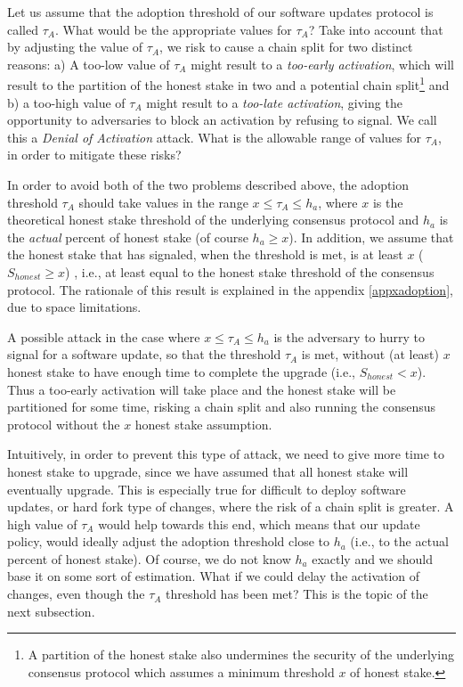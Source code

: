 Let us assume that the adoption threshold of our software updates protocol is called $\tau_A$. %
What would be the appropriate values for $\tau_A$? Take into account that by adjusting the value of $\tau_A$, we risk to cause a chain split for two distinct reasons: a) A too-low value of $\tau_A$ might result to a \emph{too-early activation}, which will result to the partition of the honest stake in two and a potential chain split\footnote{A partition of the honest stake also undermines the security of the underlying consensus protocol which assumes a minimum threshold $x$ of honest stake.}  and b) a too-high value of $\tau_A$ might result to a \emph{too-late activation}, giving the opportunity to adversaries to block an activation by refusing to signal. We call this a \emph{Denial of Activation} attack. %
What is the allowable range of values for $\tau_A$, in order to mitigate these risks?

In order to avoid both of the two problems described above, the adoption threshold $\tau_A$ should take values in the range $x \leq \tau_A \leq h_a$, where $x$ is the theoretical honest stake threshold of the underlying consensus protocol and $h_a$ is the \emph{actual} percent of honest stake (of course $h_a \geq x$). In addition, we assume that the honest stake that has signaled, when the threshold is met, is at least $x$ ($S_{honest} \geq x$) , i.e., at least equal to the honest stake threshold of the consensus protocol. The rationale of this result is explained in the appendix \ref{appxadoption}, due to space limitations.

A possible attack in the case where $x \leq \tau_A \leq h_a$ is the adversary to hurry to signal for a software update, so that the threshold $\tau_A$ is met, without (at least) $x$ honest stake to have enough time to complete the upgrade (i.e., $S_{honest} < x$). Thus a too-early activation will take place and the honest stake will be partitioned for some time, risking a chain split and also running the consensus protocol without the $x$ honest stake assumption.

Intuitively, in order to prevent this type of attack, we need to give more time to honest stake to upgrade, since we have assumed that all honest stake will eventually upgrade. This is especially true for difficult to deploy software updates, or hard fork type of changes, where the risk of a chain split is greater. A high value of $\tau_A$ would help towards this end, which means that our update policy, would ideally adjust the adoption threshold close to $h_a$ (i.e., to the actual percent of honest stake). Of course, we do not know $h_a$ exactly and we should base it on some sort of estimation. What if we could delay the activation of changes, even though the $\tau_A$ threshold has been met? This is the topic of the next subsection. 








